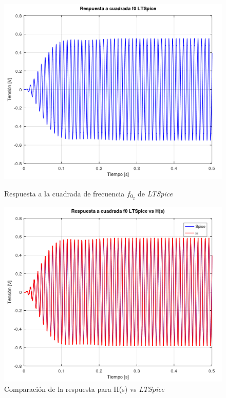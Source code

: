 \documentclass[11pt,a4paper]{report}
\begin{document}
\begin{figure}[h!]
\centering
\includegraphics[scale=1]{rtaCuadradaMedio2Spice.png}
\caption{Respuesta a la cuadrada de frecuencia $f_{0_{2}}$ de \textit{LTSpice}}
\includegraphics[scale=0.95]{rtaCuadradaMedio2SpiceComp.png}
\caption{Comparación de la respuesta para H(s) vs \textit{LTSpice}}
\end{figure}
\clearpage
\end{document}

